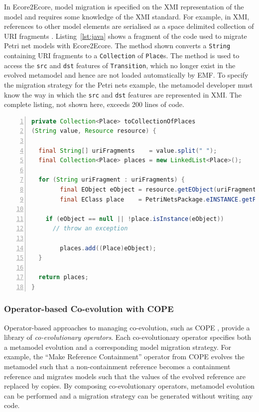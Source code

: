 In Ecore2Ecore, model migration is specified on the XMI representation of the model and requires some knowledge of the XMI standard. For example, in XMI, references to other model elements are serialised as a space delimited collection of URI fragments \cite{steinberg09emf}. Listing~\ref{lst:java} shows a fragment of the code used to migrate Petri net models with Ecore2Ecore. The method shown converts a \texttt{String} containing URI fragments to a \texttt{Collection} of \texttt{Place}s. The method is used to access the \texttt{src} and \texttt{dst} features of \texttt{Transition}, which no longer exist in the evolved metamodel and hence are not loaded automatically by EMF. To specify the migration strategy for the Petri nets example, the metamodel developer must know the way in which the \texttt{src} and \texttt{dst} features are represented in XMI. The complete listing, not shown here, exceeds 200 lines of code.

\begin{lstlisting}[basicstyle=\ttfamily\footnotesize, flexiblecolumns=true, numbers=left, nolol=true, caption=Java method for deserialising a reference., label=lst:java, language=Java, tabsize=2]
private Collection<Place> toCollectionOfPlaces
(String value, Resource resource) {

  final String[] uriFragments    = value.split(" ");
  final Collection<Place> places = new LinkedList<Place>();
 
  for (String uriFragment : uriFragments) {
		final EObject eObject = resource.getEObject(uriFragment);
		final EClass place    = PetriNetsPackage.eINSTANCE.getPlace();

    if (eObject == null || !place.isInstance(eObject))
      // throw an exception
						
		places.add((Place)eObject);
  }
 
  return places;
}
\end{lstlisting}

\subsubsection{Operator-based Co-evolution with COPE}
\label{subsubsec:cope}

Operator-based approaches to managing co-evolution, such as COPE \cite{herrmannsdoerfer09cope}, provide a library of \emph{co-evolutionary operators}. Each co-evolutionary operator specifies both a metamodel evolution and a corresponding model migration strategy. For example, the ``Make Reference Containment'' operator from COPE \cite{herrmannsdoerfer09cope} evolves the metamodel such that a non-containment reference becomes a containment reference and migrates models such that the values of the evolved reference are replaced by copies. By composing co-evolutionary operators, metamodel evolution can be performed and a migration strategy can be generated without writing any code.

